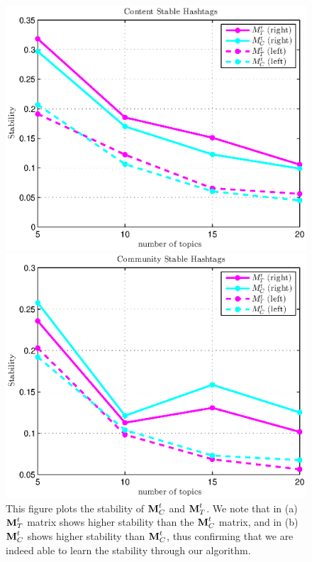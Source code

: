 \begin{figure}[!t]
\begin{center}
{\small
\begin{minipage}{0.49\linewidth}
  \centering
  \includegraphics[width=\textwidth]{KDD/images/content_stable_eigen_left_right}          
\end{minipage} 
\begin{minipage}{0.49\linewidth}
  \centering
  \includegraphics[width=\textwidth]{KDD/images/community_stable_eigen_left_right}             
\end{minipage} 
  \caption[Stability of evolution matrices]{{This figure plots the stability of $\textbf{M}^t_C$ and $\textbf{M}^t_T$.
We note that in (a) $\textbf{M}^t_T$ matrix shows higher stability than the $\textbf{M}^t_C$ matrix,
and in (b) $\textbf{M}^t_C$ shows higher stability than $\textbf{M}^t_C$, thus confirming that we are indeed able to learn the 
stability through our algorithm.}}
  \label{fig:stability_analysis}
}
\end{center}
\end{figure}

